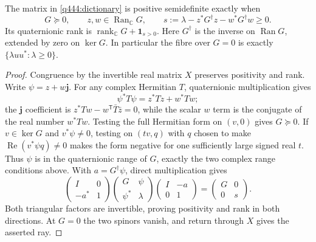 \begin{proposition}\label{q444:positive}
The matrix in \eqref{q444:dictionary} is positive semidefinite exactly when
\[
 G\succeq0,\qquad z,w\in\operatorname{Ran}_{\mathbb C}G,\qquad
 s:=\lambda-z^*G^\dagger z-w^*G^\dagger w\geq0.
\]
Its quaternionic rank is $\operatorname{rank}_{\mathbb C}G+\mathbf{1}_{s>0}$.
Here $G^\dagger$ is the inverse on $\operatorname{Ran}G$, extended by zero
on $\ker G$. In particular the fibre over $G=0$ is exactly
$\{\lambda uu^*: \lambda\geq0\}$.
\end{proposition}
\begin{proof}
Congruence by the invertible real matrix $X$ preserves positivity and rank.
Write $\psi=z+w\mathbf j$. For any complex Hermitian $T$,
quaternionic multiplication gives
\[
 \psi^*T\psi=z^*Tz+w^*Tw;
\]
the $\mathbf j$ coefficient is
$z^*Tw-w^{\mathsf T}\bar T\bar z=0$, while the scalar $w$ term is
the conjugate of the real number $w^*Tw$.
Testing the full Hermitian form on $(v,0)$ gives $G\succeq0$.
If $v\in\ker G$ and $v^*\psi\neq0$, testing on $(tv,q)$ with
$q$ chosen to make $\operatorname{Re}(v^*\psi q)\neq0$ makes the
form negative for one sufficiently large signed real $t$.
Thus $\psi$ is in the quaternionic range of $G$, exactly the two complex
range conditions above. With $a=G^\dagger\psi$, direct multiplication gives
\[
 \begin{pmatrix}I&0\\-a^*&1\end{pmatrix}
 \begin{pmatrix}G&\psi\\\psi^*&\lambda\end{pmatrix}
 \begin{pmatrix}I&-a\\0&1\end{pmatrix}
 =\begin{pmatrix}G&0\\0&s\end{pmatrix}.
\]
Both triangular factors are invertible, proving positivity and rank in
both directions. At $G=0$ the two spinors vanish, and return through $X$
gives the asserted ray.
\end{proof}

